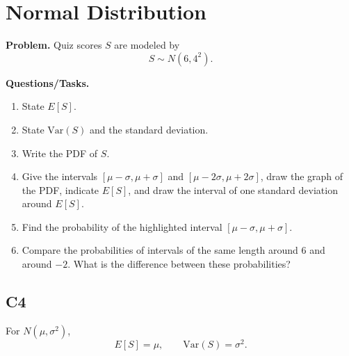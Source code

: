 \section{Normal Distribution}

\textbf{Problem.}
Quiz scores \(S\) are modeled by
\[
S\sim N(6,4^2).
\]

\textbf{Questions/Tasks.}
\begin{enumerate}[label=\textbf{\alph*)}]
	\item State \(E[S]\).
	\item State \(\mathrm{Var}(S)\) and the standard deviation.
	\item Write the PDF of \(S\).
	\item Give the intervals \([\mu-\sigma,\mu+\sigma]\) and \([\mu-2\sigma,\mu+2\sigma]\), draw the graph of the PDF, indicate \(E[S]\), and draw the interval of one standard deviation around \(E[S]\).
	\item Find the probability of the highlighted interval \([\mu-\sigma,\mu+\sigma]\).
	\item Compare the probabilities of intervals of the same length around \(6\) and around \(-2\). What is the difference between these probabilities?
\end{enumerate}

\subsection*{C4}
For \(N(\mu,\sigma^2)\),
\[
E[S]=\mu,
\qquad
\mathrm{Var}(S)=\sigma^2.
\]

